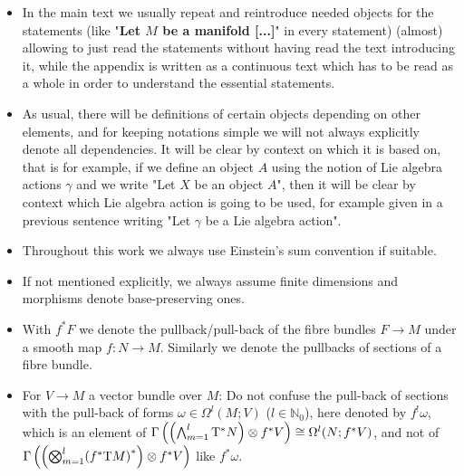 \documentclass[reqno,a4paper,oneside]{amsart}
\theoremstyle{plain}
\theoremstyle{remark}
\theoremstyle{definition}
\def\bas#1\eas{\begin{align*}#1\end{align*}}
\begin{document}
\begin{itemize}
	\item In the main text we usually repeat and reintroduce needed objects for the statements (like "\textbf{Let $M$ be a manifold [...]}" in every statement) (almost) allowing to just read the statements without having read the text introducing it, while the appendix is written as a continuous text which has to be read as a whole in order to understand the essential statements.
	\item As usual, there will be definitions of certain objects depending on other elements, and for keeping notations simple we will not always explicitly denote all dependencies. It will be clear by context on which it is based on, that is for example, if we define an object $A$ using the notion of Lie algebra actions $\gamma$ and we write "Let $X$ be an object $A$", then it will be clear by context which Lie algebra action is going to be used, for example given in a previous sentence writing "Let $\gamma$ be a Lie algebra action".
	\item Throughout this work we always use Einstein's sum convention if suitable.
	\item If not mentioned explicitly, we always assume finite dimensions and morphisms denote base-preserving ones.
	\item With $f^*F$ we denote the pullback/pull-back of the fibre bundles $F \to M$ under a smooth map $f: N \to M$. Similarly we denote the pullbacks of sections of a fibre bundle.
	\item For $V \to M$ a vector bundle over $M$: Do not confuse the pull-back of sections with the pull-back of forms $\omega \in \Omega^l(M; V)$ ($l \in \mathbb{N}_0$), here denoted by $f^!\omega$, which is an element of $\Gamma\left( \mleft(\bigwedge_{m=1}^{l} \mathrm{T}^*N \mright) \otimes f^*V \right) \cong \Omega^l(N; f^*V)$, and not of $\Gamma\left( \mleft(\bigotimes_{m=1}^{l} \mleft(f^*\mathrm{T}M\mright)^*\mright) \otimes f^*V \right)$ like $f^*\omega$. 

\end{itemize}
\end{document}
